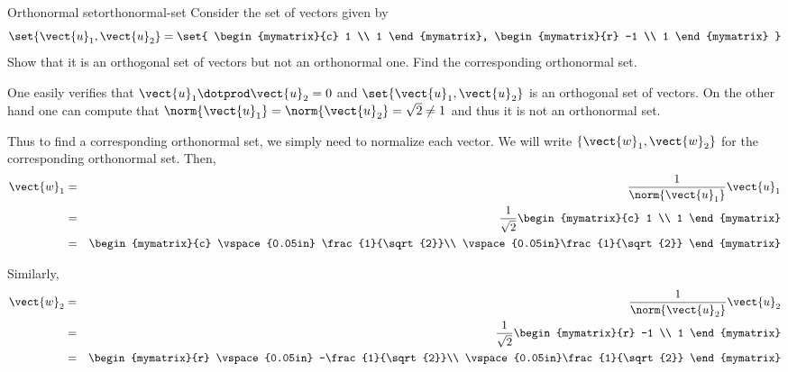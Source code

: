 \begin{example}{Orthonormal set}{orthonormal-set}
Consider the set of vectors  given by 
\[
\set{\vect{u}_1, \vect{u}_2 } = \set{
\begin{mymatrix}{c}
1 \\
1 
\end{mymatrix}, 
\begin{mymatrix}{r}
-1 \\
1
\end{mymatrix}
}
\]
Show that it is an orthogonal set of vectors  but not an orthonormal one. Find the corresponding orthonormal set. 
\end{example}

\begin{solution}
One easily verifies that $\vect{u}_1 \dotprod \vect{u}_2 = 0$ and
$\set{\vect{u}_1, \vect{u}_2 }$ is an orthogonal set of
vectors. On the other hand one can compute that $\norm{\vect{u}_1}= \norm{\vect{u}_2} =
\sqrt{2} \neq 1$ and thus it is not an orthonormal set.

Thus to find a corresponding orthonormal set, we simply need to
normalize each vector. We will write $\{\vect{w}_1, \vect{w}_2\}$
for the corresponding orthonormal set. Then,
\begin{eqnarray*}
\vect{w}_1 &=& \frac{1}{\norm{\vect{u}_1}} \vect{u}_1\\
&=& \frac{1}{\sqrt{2}} \begin{mymatrix}{c}
1 \\
1 
\end{mymatrix} \\
&=&
\begin{mymatrix}{c}
\vspace{0.05in} \frac{1}{\sqrt{2}}\\
\vspace{0.05in}\frac{1}{\sqrt{2}} 
\end{mymatrix}
\end{eqnarray*}

Similarly, 
\begin{eqnarray*}
\vect{w}_2 &=& \frac{1}{\norm{\vect{u}_2}} \vect{u}_2\\
&=& \frac{1}{\sqrt{2}} \begin{mymatrix}{r}
-1 \\
1 
\end{mymatrix} \\
&=&
\begin{mymatrix}{r}
\vspace{0.05in} -\frac{1}{\sqrt{2}}\\
\vspace{0.05in}\frac{1}{\sqrt{2}} 
\end{mymatrix}
\end{eqnarray*}


\end{solution}
